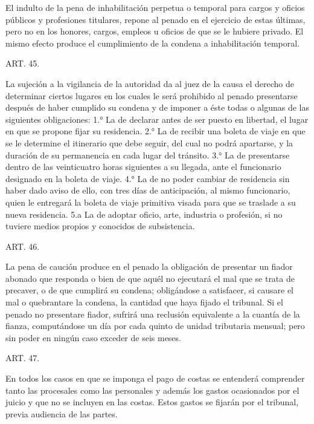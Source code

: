     El indulto de la pena de inhabilitación perpetua o temporal para cargos y oficios públicos y profesiones titulares, repone al penado en el ejercicio de estas últimas, pero no en los honores, cargos, empleos u oficios de que se le hubiere privado. El mismo efecto produce el cumplimiento de la condena a inhabilitación temporal.



    ART. 45.

    La sujeción a la vigilancia de la autoridad da al juez de la causa el derecho de determinar ciertos lugares en los cuales le será prohibido al penado presentarse después de haber cumplido su condena y de imponer a éste todas o algunas de las siguientes obligaciones:
    1.° La de declarar antes de ser puesto en libertad, el lugar en que se propone fijar su residencia.
    2.° La de recibir una boleta de viaje en que se le determine el itinerario que debe seguir, del cual no podrá apartarse, y la duración de su permanencia en cada lugar del tránsito.
    3.° La de presentarse dentro de las veinticuatro horas siguientes a su llegada, ante el funcionario designado en la boleta de viaje.
    4.° La de no poder cambiar de residencia sin haber dado aviso de ello, con tres días de anticipación, al mismo funcionario, quien le entregará la boleta de viaje primitiva visada para que se traslade a su nueva residencia.
    5.a La de adoptar oficio, arte, industria o profesión, si no tuviere medios propios y conocidos de subsistencia.


    ART. 46.

    La pena de caución produce en el penado la obligación de presentar un fiador abonado que responda o bien de que aquél no ejecutará el mal que se trata de precaver, o de que cumplirá su condena; obligándose a satisfacer, si causare el mal o quebrantare la condena, la cantidad que haya fijado el tribunal.
    Si el penado no presentare fiador, sufrirá una reclusión equivalente a la cuantía de la fianza, computándose un día por cada quinto de unidad tributaria mensual; pero sin poder en ningún caso exceder de seis meses.





    ART. 47.

    En todos los casos en que se imponga el pago de costas se entenderá comprender tanto las procesales como las personales y además los gastos ocasionados por el juicio y que no se incluyen en las costas. Estos gastos se fijarán por el tribunal, previa audiencia de las partes.



